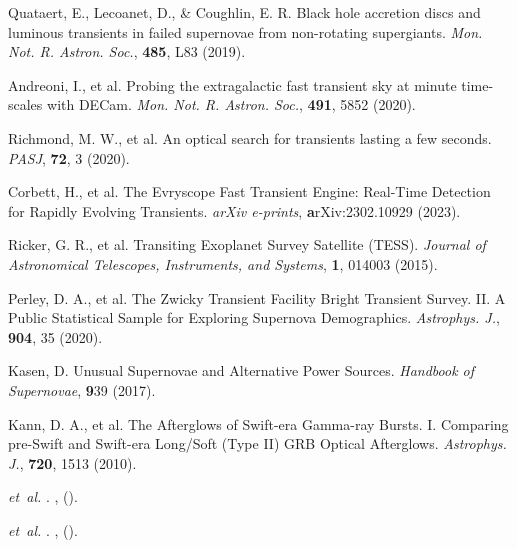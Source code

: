 \documentclass{nature_plusfigure}
\newcommand{\mn}{{Mon. Not. R. Astron. Soc.}}
\newcommand{\mnras}{\mn}
\newcommand{\apj}{{Astrophys. J.}}
\newcommand{\apjl}{{Astrophys. J. Lett.}}
\newcommand{\pasj}{{PASJ}}
\begin{document}
\begin{thebibliography}{100}
  Quataert, E., Lecoanet, D., \& Coughlin, E. R. Black hole accretion discs and luminous transients in failed supernovae from non-rotating supergiants. \emph{\mnras}, \textbf{485}, L83 (2019). 


 Andreoni, I., et al. Probing the extragalactic fast transient sky at minute time-scales with DECam. \emph{\mnras}, \textbf{491}, 5852 (2020). 

 Richmond, M. W., et al. An optical search for transients lasting a few seconds. \emph{\pasj}, \textbf{72}, 3 (2020). 

 Corbett, H., et al. The Evryscope Fast Transient Engine: Real-Time Detection for Rapidly Evolving Transients. \emph{arXiv e-prints}, \textbf arXiv:2302.10929 (2023). 


  Ricker, G. R., et al. Transiting Exoplanet Survey Satellite (TESS). \emph{Journal of Astronomical Telescopes, Instruments, and Systems}, \textbf{1}, 014003 (2015). 
 
 
  Perley, D. A., et al. The Zwicky Transient Facility Bright Transient Survey. II. A Public Statistical Sample for Exploring Supernova Demographics. \emph{\apj}, \textbf{904}, 35 (2020). 
 
  Kasen, D. Unusual Supernovae and Alternative Power Sources. \emph{Handbook of Supernovae}, \textbf 939 (2017). 
 
 
 
  Kann, D. A., et al. The Afterglows of Swift-era Gamma-ray Bursts. I. Comparing pre-Swift and Swift-era Long/Soft (Type II) GRB Optical Afterglows. \emph{\apj}, \textbf{720}, 1513 (2010). 
 
 \emph{et~al.}
\newblock {}.
\newblock \emph{\bibinfo{journal}{\apjl}} \textbf{},
   ().

 \emph{et~al.}
\newblock {}.
\newblock \emph{} \textbf{},
   ().


\end{thebibliography}
\end{document}
